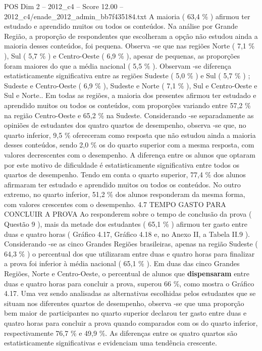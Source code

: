 \begin{textsample}{POS Dim 2 – 2012\_c4 – Score 12.00 – 2012\_c4/enade\_2012\_admin\_bb7f435184.txt}
A maioria ( 63,4 \% ) afirmou ter estudado e aprendido muitos ou todos os conteúdos.
Na análise por Grande Região, a proporção de respondentes que escolheram a opção não estudou ainda a maioria desses conteúdos, foi pequena.
Observa -se que nas regiões Norte ( 7,1 \% ), Sul ( 5,7 \% ) e Centro-Oeste ( 6,9 \% ), apesar de pequenas, as proporções foram maiores do que a média nacional ( 5,5 \% ).
Observam -se diferença estatisticamente significativa entre as regiões Sudeste ( 5,0 \% ) e Sul ( 5,7 \% ) ; Sudeste e Centro-Oeste ( 6,9 \% ), Sudeste e Norte ( 7,1 \% ), Sul e Centro-Oeste e Sul e Norte..
Em todas as regiões, a maioria dos presentes afirmou ter estudado e aprendido muitos ou todos os conteúdos, com proporções variando entre 57,2 \% na região Centro-Oeste e 65,2 \% na Sudeste.
Considerando -se separadamente as opiniões de estudantes dos quatro quartos de desempenho, observa -se que, no quarto inferior, 9,5 \% ofereceram como resposta que não estudou ainda a maioria desses conteúdos, sendo 2,0 \% os do quarto superior com a mesma resposta, com valores decrescentes com o desempenho.
A diferença entre os alunos que optaram por este motivo de dificuldade é estatisticamente significativa entre todos os quartos de desempenho.
Tendo em conta o quarto superior, 77,4 \% dos alunos afirmaram ter estudado e aprendido muitos ou todos os conteúdos.
No outro extremo, no quarto inferior, 51,2 \% dos alunos responderam da mesma forma, com valores crescentes com o desempenho. 4.7 TEMPO GASTO PARA CONCLUIR A PROVA Ao responderem sobre o tempo de conclusão da prova ( Questão 9 ), mais da metade dos estudantes ( 65,1 \% ) afirmou ter gasto entre duas e quatro horas ( Gráfico 4.17, Gráfico 4.18 e, no Anexo II, a Tabela II.9 ).
Considerando -se as cinco Grandes Regiões brasileiras, apenas na região Sudeste ( 64,3 \% ) o percentual dos que utilizaram entre duas e quatro horas para finalizar a prova foi inferior à média nacional ( 65,1 \% ).
Em duas das cinco Grandes Regiões, Norte e Centro-Oeste, o percentual de alunos que \textbf{dispensaram} entre duas e quatro horas para concluir a prova, superou 66 \%, como mostra o Gráfico 4.17.
Uma vez sendo analisadas as alternativas escolhidas pelos estudantes que se situam nos diferentes quartos de desempenho, observa -se que uma proporção bem maior de participantes no quarto superior declarou ter gasto entre duas e quatro horas para concluir a prova quando comparados com os do quarto inferior, respectivamente 76,7 \% e 49,9 \%.
As diferenças entre os quatro quartos são estatisticamente significativas e evidenciam uma tendência crescente.

\end{textsample}
